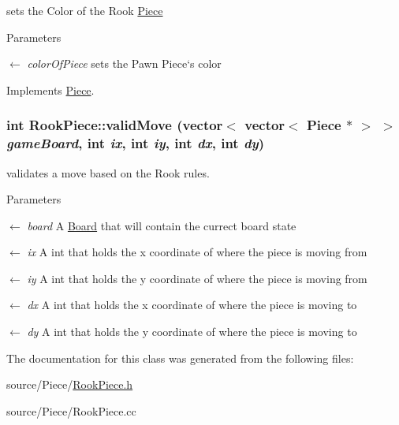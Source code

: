 sets the Color of the Rook \hyperlink{classPiece}{Piece} 
\begin{DoxyParams}{Parameters}
\item[\mbox{$\leftarrow$} {\em colorOfPiece}]sets the Pawn Piece`s color \end{DoxyParams}


Implements \hyperlink{classPiece_a1387cb503dca308ac1e3bbe38a70a073}{Piece}.\hypertarget{classRookPiece_a451d36ccd1ccba8001acd3fff364904e}{
\subsubsection[{validMove}]{\setlength{\rightskip}{0pt plus 5cm}int RookPiece::validMove (vector$<$ vector$<$ {\bf Piece} $\ast$ $>$ $>$ {\em gameBoard}, \/  int {\em ix}, \/  int {\em iy}, \/  int {\em dx}, \/  int {\em dy})}}
\label{classRookPiece_a451d36ccd1ccba8001acd3fff364904e}


validates a move based on the Rook rules. 
\begin{DoxyParams}{Parameters}
\item[\mbox{$\leftarrow$} {\em board}]A \hyperlink{classBoard}{Board} that will contain the currect board state \item[\mbox{$\leftarrow$} {\em ix}]A int that holds the x coordinate of where the piece is moving from \item[\mbox{$\leftarrow$} {\em iy}]A int that holds the y coordinate of where the piece is moving from \item[\mbox{$\leftarrow$} {\em dx}]A int that holds the x coordinate of where the piece is moving to \item[\mbox{$\leftarrow$} {\em dy}]A int that holds the y coordinate of where the piece is moving to \end{DoxyParams}


The documentation for this class was generated from the following files:\begin{DoxyCompactItemize}
\item 
source/Piece/\hyperlink{RookPiece_8h}{RookPiece.h}\item 
source/Piece/RookPiece.cc\end{DoxyCompactItemize}

